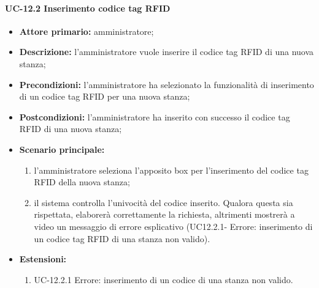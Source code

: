 \paragraph{UC-12.2 Inserimento codice tag RFID}
   \begin{itemize}
	\item \textbf{Attore primario:} amministratore;
	\item \textbf{Descrizione:} l'amministratore vuole inserire il codice tag RFID di una nuova stanza;
	\item \textbf{Precondizioni:} l'amministratore ha selezionato la funzionalità di inserimento di un codice tag RFID per una nuova stanza;
	\item \textbf{Postcondizioni:} l'amministratore ha inserito con successo il codice tag RFID di una nuova stanza;
	\item \textbf{Scenario principale:}
	      \begin{enumerate}
		      \item l'amministratore seleziona l'apposito box per l'inserimento del codice tag RFID della nuova stanza;
		      \item il sistema controlla l'univocità del codice inserito. Qualora questa sia rispettata, elaborerà correttamente la richiesta, altrimenti mostrerà a video un messaggio di errore esplicativo (UC12.2.1- Errore: inserimento di un codice tag RFID di una stanza non valido).
	      \end{enumerate}
	\item \textbf{Estensioni:}
		\begin{enumerate}
		      \item UC-12.2.1 Errore: inserimento di un codice di una stanza non valido.
	      \end{enumerate}
\end{itemize}

